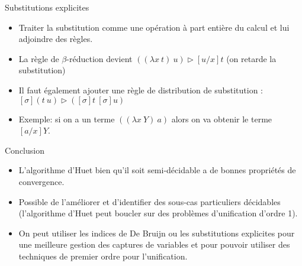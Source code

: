 \documentclass{beamer}
\begin{document}
\begin{frame}{Substitutions explicites}
\begin{itemize}
    \item Traiter la substitution comme une opération à part entière du calcul et lui adjoindre des règles.
    \item La règle de $\beta$-réduction devient $((\lambda x\ t)\ u) \rhd [u/x]t$ (on retarde la substitution)
    \item Il faut également ajouter une règle de distribution de substitution : $[\sigma](t\ u) \rhd ([\sigma]t\ [\sigma]u)$
\end{itemize}
\vspace{1\baselineskip}
\begin{itemize}
    \item[] Exemple: si on a un terme $((\lambda x\ Y)\ a)$ alors on va obtenir le terme $[a/x]Y$. 
    \end{itemize}
\end{frame}

\begin{frame}{Conclusion}
    \begin{itemize}
        \item L'algorithme d'Huet bien qu'il soit semi-décidable a de bonnes propriétés de convergence.
        \item Possible de l'améliorer et d'identifier des sous-cas particuliers décidables (l'algorithme d'Huet peut boucler sur des problèmes d'unification d'ordre 1).
        \item On peut utiliser les indices de De Bruijn ou les substitutions explicites pour une meilleure gestion des captures de variables et pour pouvoir utiliser des techniques de premier ordre pour l'unification.
    \end{itemize}
\end{frame}
\end{document}
